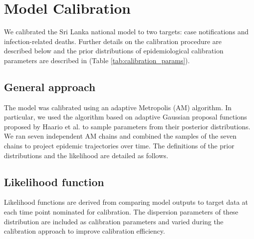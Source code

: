 \section{Model Calibration}
We calibrated the Sri Lanka national model to two targets: case notifications and infection-related deaths. Further details on the calibration procedure are described below and the prior distributions of epidemiological calibration parameters are described in (Table \ref{tab:calibration_params}). 

\subsection{General approach}
The model was calibrated using an adaptive Metropolis (AM) algorithm. In particular, we used the algorithm
based on adaptive Gaussian proposal functions proposed by Haario et al. to sample parameters from
their posterior distributions. We ran seven independent AM chains and combined the samples of the
seven chains to project epidemic trajectories over time. The definitions of the prior distributions and the
likelihood are detailed as follows.

\subsection{Likelihood function}
Likelihood functions are derived from comparing model outputs to target data at each time point nominated
for calibration. The dispersion parameters of these distribution are included as calibration parameters and
varied during the calibration approach to improve calibration efficiency.

